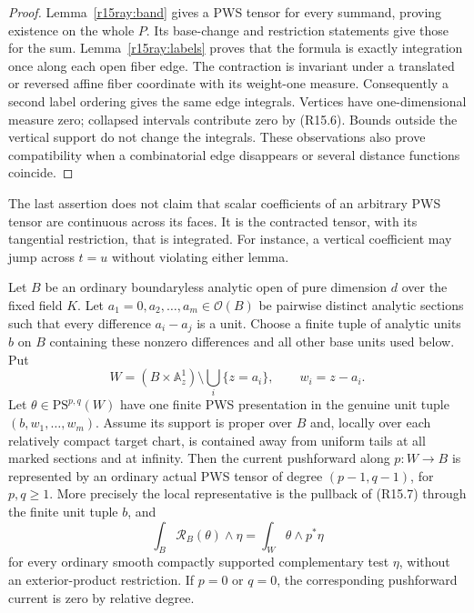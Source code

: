 \begin{proof}
Lemma~\ref{r15ray:band} gives a PWS tensor for every summand, proving
existence on the whole $P$.  Its base-change and restriction statements
give those for the sum.  Lemma~\ref{r15ray:labels} proves that the
formula is exactly integration once along each open fiber edge.
The contraction is invariant under a translated or reversed affine
fiber coordinate with its weight-one measure.  Consequently a second
label ordering gives the same edge integrals.  Vertices have
one-dimensional measure zero; collapsed intervals contribute zero by
(R15.6).  Bounds outside the vertical support do not change the
integrals.  These observations also prove compatibility when a
combinatorial edge disappears or several distance functions coincide.
\end{proof}

The last assertion does not claim that scalar coefficients of an
arbitrary PWS tensor are continuous across its faces.  It is the
contracted tensor, with its tangential restriction, that is integrated.
For instance, a vertical coefficient may jump across $t=u$ without
violating either lemma.

\begin{proposition}
\label{r15ray:analytic}
Let $B$ be an ordinary boundaryless analytic open of pure dimension $d$
over the fixed field $K$.  Let $a_1=0,a_2,\ldots,a_m\in\mathcal O(B)$
be pairwise distinct analytic sections such that every difference
$a_i-a_j$ is a unit.  Choose a finite tuple of analytic units $b$ on
$B$ containing these nonzero differences and all other base units
used below.  Put
\[
 W=(B\times\mathbb A^1_z)\setminus
                 \bigcup_i\{z=a_i\},\qquad w_i=z-a_i.
\]
Let $\theta\in\mathrm{PS}^{p,q}(W)$ have one finite PWS presentation
in the genuine unit tuple $(b,w_1,\ldots,w_m)$.  Assume its support
is proper over $B$ and, locally over each relatively compact target
chart, is contained away from uniform tails at all marked sections
and at infinity.  Then the current pushforward along $p:W\to B$
is represented by an ordinary actual PWS tensor of degree
$(p-1,q-1)$, for $p,q\geq1$.  More precisely the local representative
is the pullback of (R15.7) through the finite unit tuple $b$, and
\[
 \int_B\mathcal R_B(\theta)\wedge\eta
     =\int_W\theta\wedge p^*\eta                      \tag{R15.8}
\]
for every ordinary smooth compactly supported complementary test
$\eta$, without an exterior-product restriction.  If $p=0$ or $q=0$,
the corresponding pushforward current is zero by relative degree.
\end{proposition}

